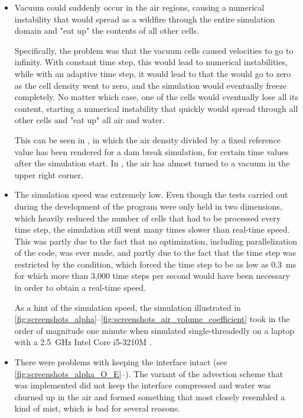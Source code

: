 \begin{itemize}
    \item Vacuum could suddenly occur in the air regions, causing a numerical instability that would spread as a wildfire through the entire simulation domain and "eat up" the contents of all other cells.
    
    Specifically, the problem was that the vacuum cells caused velocities to go to infinity. With constant time step, this would lead to numerical instabilities, while with an adaptive time step, it would lead to that the \timestep would go to zero as the cell density went to zero, and the simulation would eventually freeze completely. No matter which case, one of the cells would eventually lose all its content, starting a numerical instability that quickly would spread through all other cells and "eat up" all air and water.
    
    This can be seen in , in which the air density divided by a fixed reference value has been rendered for a dam break simulation, for certain time values after the simulation start. In , the air has almost turned to a vacuum in the upper right corner.
    
    \item The simulation speed was extremely low. Even though the tests carried out during the development of the program were only held in two dimensions, which heavily reduced the number of cells that had to be processed every time step, the simulation still went many times slower than real-time speed. This was partly due to the fact that no optimization, including parallelization of the code, was ever made, and partly due to the fact that the time step was restricted by the \CFL condition, which forced the time step to be as low as 0.3~ms for which more than \mbox{3,000} time steps per second would have been necessary in order to obtain a real-time speed.
    
    As a hint of the simulation speed, the simulation illustrated in \figrefs \ref{fig:screenshots_alpha}--\ref{fig:screenshots_air_volume_coefficient} took in the order of magnitude one minute when simulated single-threadedly on a laptop with a \mbox{2.5 GHz} Intel Core \mbox{i5-3210M} \CPU.
    
    \item There were problems with keeping the interface intact (see \figrefs \mbox{\ref{fig:screenshots_alpha_O_E}--}). The variant of the  advection scheme that was implemented did not keep the interface compressed and water was churned up in the air and formed something that most closely resembled a kind of mist, which is bad for several reasons.
    

\end{itemize}
